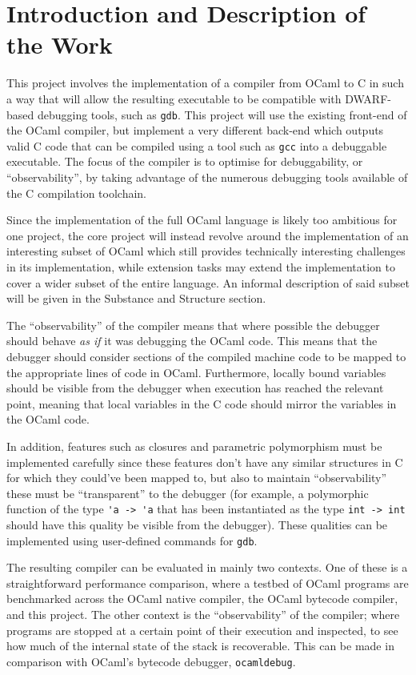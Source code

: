 \section*{Introduction and Description of the Work}

This project involves the implementation of a compiler from OCaml to C in such
a way that will allow the resulting executable to be compatible with
DWARF-based debugging tools, such as \texttt{gdb}. This project will use the
existing front-end of the OCaml compiler, but implement a very different
back-end which outputs valid C code that can be compiled using a tool such as
\texttt{gcc} into a debuggable executable. The focus of the compiler is to
optimise for debuggability, or ``observability'', by taking advantage of the
numerous debugging tools available of the C compilation toolchain.

Since the implementation of the full OCaml language is likely too ambitious for
one project, the core project will instead revolve around the implementation of
an interesting subset of OCaml which still provides technically interesting
challenges in its implementation, while extension tasks may extend the
implementation to cover a wider subset of the entire language. An informal
description of said subset will be given in the Substance and Structure
section.

The ``observability'' of the compiler means that where possible the debugger
should behave \emph{as if} it was debugging the OCaml code. This means that the
debugger should consider sections of the compiled machine code to be mapped to
the appropriate lines of code in OCaml. Furthermore, locally bound variables
should be visible from the debugger when execution has reached the relevant
point, meaning that local variables in the C code should mirror the variables
in the OCaml code.

In addition, features such as closures and parametric polymorphism must be
implemented carefully since these features don't have any similar structures in
C for which they could've been mapped to, but also to maintain
``observability'' these must be ``transparent'' to the debugger (for example, a
polymorphic function of the type \verb!'a -> 'a! that has been instantiated as
the type \verb!int -> int! should have this quality be visible from the
debugger). These qualities can be implemented using user-defined commands for
\texttt{gdb}.

The resulting compiler can be evaluated in mainly two contexts. One of these is
a straightforward performance comparison, where a testbed of OCaml programs are
benchmarked across the OCaml native compiler, the OCaml bytecode compiler, and
this project. The other context is the ``observability'' of the compiler; where
programs are stopped at a certain point of their execution and inspected, to
see how much of the internal state of the stack is recoverable. This can be
made in comparison with OCaml's bytecode debugger, \texttt{ocamldebug}.


